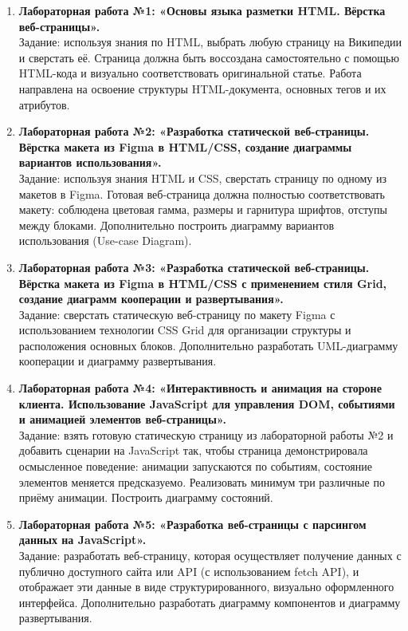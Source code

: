 \begin{enumerate}
    \item \textbf{Лабораторная работа №1: «Основы языка разметки HTML. Вёрстка веб-страницы».} \\
    Задание: используя знания по HTML, выбрать любую страницу на Википедии и сверстать её. Страница должна быть воссоздана самостоятельно с помощью HTML-кода и визуально соответствовать оригинальной статье. Работа направлена на освоение структуры HTML-документа, основных тегов и их атрибутов.

    \item \textbf{Лабораторная работа №2: «Разработка статической веб-страницы. Вёрстка макета из Figma в HTML/CSS, создание диаграммы вариантов использования».} \\
    Задание: используя знания HTML и CSS, сверстать страницу по одному из макетов в Figma. Готовая веб-страница должна полностью соответствовать макету: соблюдена цветовая гамма, размеры и гарнитура шрифтов, отступы между блоками. Дополнительно построить диаграмму вариантов использования (Use-case Diagram).

    \item \textbf{Лабораторная работа №3: «Разработка статической веб-страницы. Вёрстка макета из Figma в HTML/CSS с применением стиля Grid, создание диаграмм кооперации и развертывания».} \\
    Задание: сверстать статическую веб-страницу по макету Figma с использованием технологии CSS Grid для организации структуры и расположения основных блоков. Дополнительно разработать UML-диаграмму кооперации и диаграмму развертывания.

    \item \textbf{Лабораторная работа №4: «Интерактивность и анимация на стороне клиента. Использование JavaScript для управления DOM, событиями и анимацией элементов веб-страницы».} \\
    Задание: взять готовую статическую страницу из лабораторной работы №2 и добавить сценарии на JavaScript так, чтобы страница демонстрировала осмысленное поведение: анимации запускаются по событиям, состояние элементов меняется предсказуемо. Реализовать минимум три различные по приёму анимации. Построить диаграмму состояний.

    \item \textbf{Лабораторная работа №5: «Разработка веб-страницы с парсингом данных на JavaScript».} \\
    Задание: разработать веб-страницу, которая осуществляет получение данных с публично доступного сайта или API (с использованием fetch API), и отображает эти данные в виде структурированного, визуально оформленного интерфейса. Дополнительно разработать диаграмму компонентов и диаграмму развертывания.


\end{enumerate}
